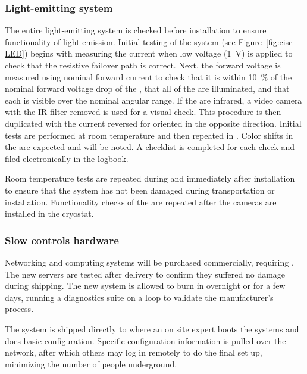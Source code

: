 \subsubsection{Light-emitting system}
\label{sec:fdgen-slow-cryo-qc-les}

The entire light-emitting system is checked before installation to ensure functionality of light emission. 
Initial testing of the system (see Figure~\ref{fig:cisc-LED}) begins with
measuring the current when low voltage (\SI{1}{V}) is applied to check
that the resistive  failover path is correct. Next, the forward voltage is measured using nominal forward current to
check that it is within \SI{10}{\%} of the nominal forward voltage drop of
the , that all of the  are illuminated, and that each  is visible over the nominal angular range. If the  are
infrared, a video camera with the IR filter removed is used for a
visual check. This procedure is then duplicated with the current
reversed for  oriented in the opposite direction. Initial tests are performed at room temperature and then repeated in . 
Color shifts in the  are expected and will be noted. A checklist is completed for each  check and filed electronically in the  logbook.

Room temperature tests are repeated during and immediately after installation to ensure that the system has not been damaged during transportation or installation. Functionality checks of the  are repeated after the cameras are installed in the cryostat.

\subsubsection{Slow controls hardware}
\label{sec:fdsp-slow-cryo-qc-sc-hard}

Networking and computing systems will be purchased commercially, requiring . The new servers %
are tested after delivery to confirm they suffered no damage during shipping. The new system is allowed to burn in overnight or for a few days, 
running a diagnostics suite on a loop to validate %
the manufacturer's  process.

The system %
is shipped directly to \surf
where an on site
expert %
boots the systems and does basic
configuration. %
Specific configuration information %
is pulled over
the network, after which others may log in remotely to do the final
set up, minimizing the number of people underground.


